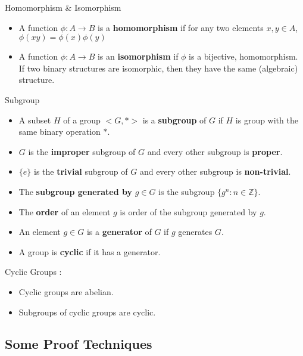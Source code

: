 \begin{definition} Homomorphism \& Isomorphism
	\begin{itemize}
		\item A function $\phi : A \to B$ is a \textbf{homomorphism} if for any two elements $x,y \in A$, $\phi (xy) = \phi(x)\phi(y)$%
		\item A function $\phi : A \to B$ is an \textbf{isomorphism} if $\phi$ is a bijective, homomorphism. If two binary structures  are isomorphic, then they have the same (algebraic) structure.%
	\end{itemize}
\end{definition}

\begin{definition} Subgroup
	\begin{itemize}
		\item A subset $H$ of a group $<\! G,\ast\! >$ is a \textbf{subgroup} of $G$ if $H$ is group with the same binary operation $\ast$. %
		\item $G$ is the \textbf{improper} subgroup of $G$ and every other subgroup is \textbf{proper}.%
		\item $\{e\}$ is the \textbf{trivial} subgroup of $G$ and every other subgroup is \textbf{non-trivial}.%
		\item The \textbf{subgroup generated by} $g \in G$ is the subgroup $\{ g^n : n \in \mathbb{Z} \}$.%
		\item The \textbf{order} of an element $g$ is order of the subgroup generated by $g$.%
		\item An element $g \in G$ is a \textbf{generator} of $G$ if $g$ generates $G$.%
		\item A group is \textbf{cyclic} if it has a generator.%
	\end{itemize}
\end{definition}

\begin{remark}
	Cyclic Groups :
	\begin{itemize}
		\item Cyclic groups are abelian.%
		\item Subgroups of cyclic groups are cyclic.%
	\end{itemize}
\end{remark}

\subsection{Some Proof Techniques}

